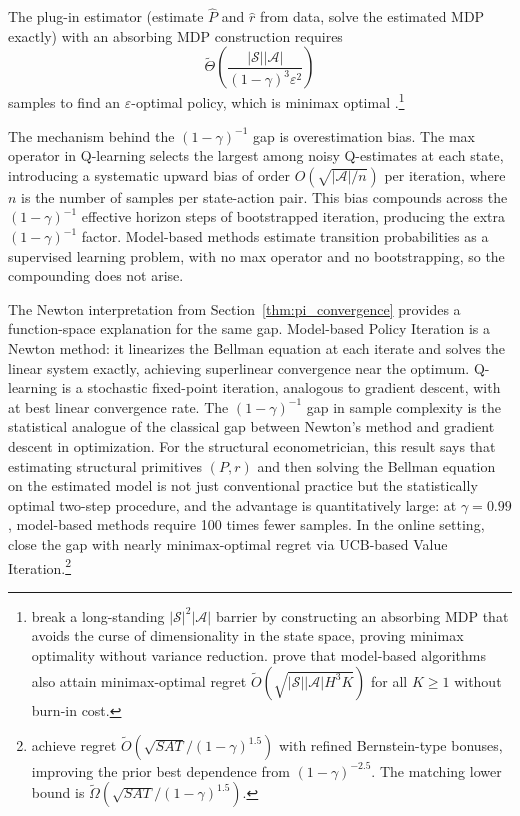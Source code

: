 \begin{theorem}
\label{thm:model_based_sample}
The plug-in estimator (estimate $\hat{P}$ and $\hat{r}$ from data, solve the estimated MDP exactly) with an absorbing MDP construction requires
\[
\tilde{\Theta}\!\left(\frac{|\mathcal{S}||\mathcal{A}|}{(1-\gamma)^3 \varepsilon^2}\right)
\]
samples to find an $\varepsilon$-optimal policy, which is minimax optimal \citep{li2024breaking}.\footnote{\citet{li2024breaking} break a long-standing $|\mathcal{S}|^2|\mathcal{A}|$ barrier by constructing an absorbing MDP that avoids the curse of dimensionality in the state space, proving minimax optimality without variance reduction. \citet{zhang2024settling} prove that model-based algorithms also attain minimax-optimal regret $\tilde{O}(\sqrt{|\mathcal{S}||\mathcal{A}|H^3K})$ for all $K \geq 1$ without burn-in cost.}
\end{theorem}

The mechanism behind the $(1-\gamma)^{-1}$ gap is overestimation bias. The max operator in Q-learning selects the largest among noisy Q-estimates at each state, introducing a systematic upward bias of order $O(\sqrt{|\mathcal{A}|/n})$ per iteration, where $n$ is the number of samples per state-action pair. This bias compounds across the $(1-\gamma)^{-1}$ effective horizon steps of bootstrapped iteration, producing the extra $(1-\gamma)^{-1}$ factor. Model-based methods estimate transition probabilities as a supervised learning problem, with no max operator and no bootstrapping, so the compounding does not arise.

The Newton interpretation from Section~\ref{thm:pi_convergence} provides a function-space explanation for the same gap. Model-based Policy Iteration is a Newton method: it linearizes the Bellman equation at each iterate and solves the linear system exactly, achieving superlinear convergence near the optimum. Q-learning is a stochastic fixed-point iteration, analogous to gradient descent, with at best linear convergence rate. The $(1-\gamma)^{-1}$ gap in sample complexity is the statistical analogue of the classical gap between Newton's method and gradient descent in optimization. For the structural econometrician, this result says that estimating structural primitives $(P, r)$ and then solving the Bellman equation on the estimated model is not just conventional practice but the statistically optimal two-step procedure, and the advantage is quantitatively large: at $\gamma = 0.99$, model-based methods require 100 times fewer samples. In the online setting, \citet{he2021nearly} close the gap with nearly minimax-optimal regret via UCB-based Value Iteration.\footnote{\citet{he2021nearly} achieve regret $\tilde{O}(\sqrt{SAT}/(1-\gamma)^{1.5})$ with refined Bernstein-type bonuses, improving the prior best dependence from $(1-\gamma)^{-2.5}$. The matching lower bound is $\tilde{\Omega}(\sqrt{SAT}/(1-\gamma)^{1.5})$.}

